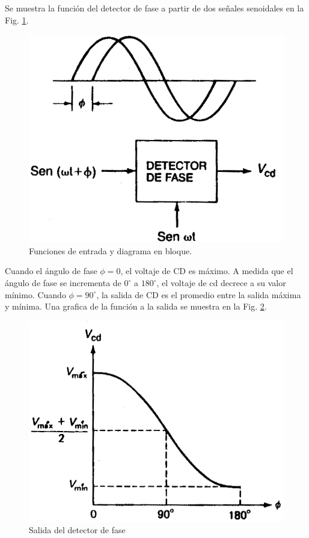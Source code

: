 \documentclass[10pt,a4paper]{IEEEtran}
\begin{document}
    Se muestra la función del detector de fase a partir de dos señales senoidales en la Fig. \ref{def1}.
    
    \begin{figure}[H]
        \centering
        \includegraphics[scale=0.3]{def1.png}
        \caption{Funciones de entrada y diagrama en bloque.}
        \label{def1}
    \end{figure}
    
    Cuando el ángulo de fase $\phi=0$, el voltaje de CD es máximo. A medida que el ángulo de fase se incrementa de $0^\circ$ a $180^\circ$, el voltaje de cd decrece a su valor mínimo. Cuando $\phi=90^\circ$, la salida de CD es el promedio entre la salida máxima y mínima. Una grafica de la función a la salida se muestra en la Fig. \ref{def2}.
    
    \begin{figure}[H]
        \centering
        \includegraphics[scale=0.3]{def2.png}
        \caption{Salida del detector de fase}
        \label{def2}
    \end{figure}
    
\end{document}
